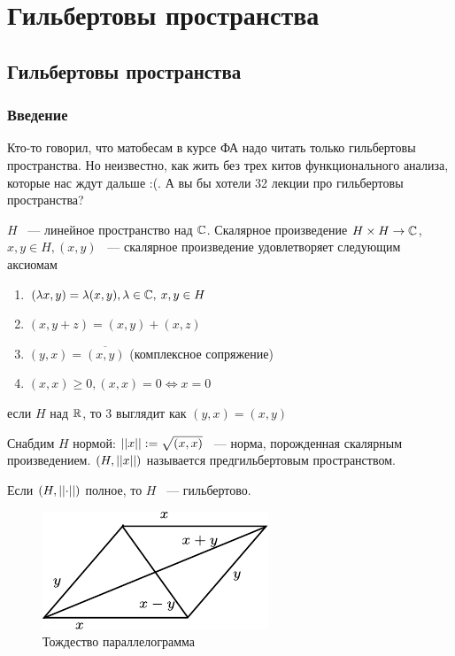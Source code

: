 \documentclass[document]{subfiles}
\begin{document}
\part{Гильбертовы пространства}
\chapter{Гильбертовы пространства}
\section{Введение}
Кто-то говорил, что матобесам в курсе ФА надо читать только гильбертовы пространства. Но неизвестно, как жить без трех китов функционального анализа, которые нас ждут дальше :(. 
А вы бы хотели 32 лекции про гильбертовы пространства?

\begin{definition}
    $H$ ~--- линейное пространство над $\mathbb{C}$. Скалярное произведение $H \times H \rightarrow \mathbb{C}$, $x,y \in H, (x,y)$ ~--- скалярное произведение удовлетворяет следующим аксиомам
    \begin{enumerate}
        \item $(\lambda x, y) = \lambda(x,y), \lambda \in \mathbb{C}, \: x,y \in H$ 
        \item $(x, y+z) = (x,y) + (x,z)$
        \item $(y,x) = \overline{(x,y)}$ (комплексное сопряжение) 
        \item $(x,x) \geq 0, (x,x) = 0 \Leftrightarrow x = 0$
    \end{enumerate}
    если $H$ над $\mathbb{R}$, то 3 выглядит как $(y,x) = (x,y)$
\end{definition}

Снабдим $H$ нормой: $\left|\left| {x} \right| \right| := \sqrt{(x,x)}$ ~--- норма, порожденная скалярным произведением. $(H, \left|\left| {x} \right| \right|)$ называется предгильбертовым пространством.

Если $(H, \left|\left| {\cdot} \right| \right|)$ полное, то $H$ ~--- гильбертово.

\begin{figure}
    \centering
    \includegraphics*{images/chapter5/parallelogram.pdf}\caption{Тождество параллелограмма}
\end{figure}
\end{document}
